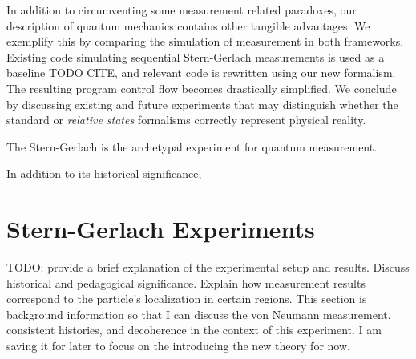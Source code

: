 In addition to circumventing some measurement related paradoxes, our description of quantum
mechanics contains other tangible advantages. We exemplify this by comparing the simulation of measurement in  both frameworks. Existing code simulating sequential Stern-Gerlach measurements is used as a baseline TODO CITE, and relevant code is rewritten using our new formalism. The resulting program control flow becomes drastically simplified. We conclude by discussing existing and future experiments that may distinguish whether the standard or \textit{relative states} formalisms correctly represent physical reality.

The Stern-Gerlach is the archetypal experiment for quantum measurement.

In addition to its historical significance,

\chapter{Stern-Gerlach Experiments}
TODO: provide a brief explanation of the experimental setup and results. Discuss historical and pedagogical significance. Explain how measurement results correspond to the particle's localization in certain regions. This section is background information so that I can discuss the von Neumann measurement, consistent histories, and decoherence in the context of this experiment. I am saving it for later to focus on the introducing the new theory for now.

%
%

